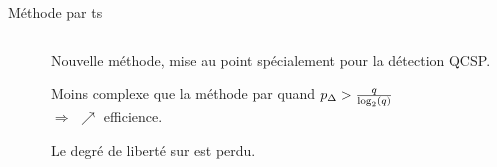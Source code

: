 \documentclass[../main.tex]{subfiles}
\begin{document}
\begin{frame}{Méthode par \acrfull{ts}}{}
\begin{columns}
\begin{column}{.45\linewidth}
\begin{overlayarea}{\linewidth}{.5\textheight}
      \end{overlayarea}
    \end{column}
    \begin{column}{.55\linewidth}
      Nouvelle méthode, mise au point spécialement pour la détection QCSP.
      \begin{ctrlitemize}{0pt}
        \item [\bonus] Moins complexe que la méthode par \fft{} quand \textcolor{red}{$p_\Delta{} > \frac{q}{\log_2(q)}$} \cite{moniereTimeSlidingWindow2021}\\$\Rightarrow$ $\nearrow$ efficience.
        \item [\malus] Le degré de liberté sur \textcolor{red}{\pd{}} est perdu.
      \end{ctrlitemize}
    \end{column}
  \end{columns}
\end{frame}
\end{document}
